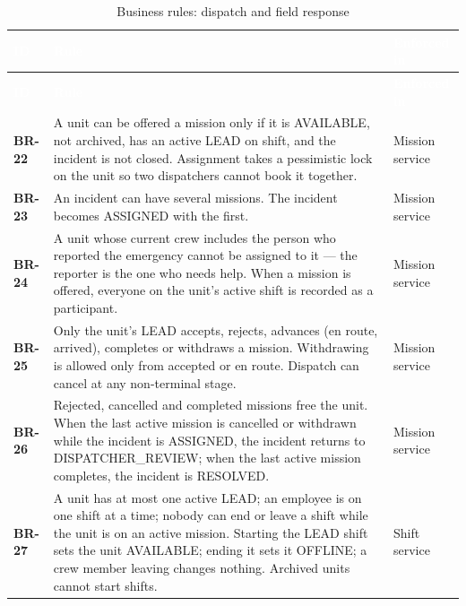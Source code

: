 {\tabfont\rowband
\begin{longtable}{@{}>{\raggedright\arraybackslash}p{}>{\raggedright\arraybackslash}p{}>{\raggedright\arraybackslash}p{}@{}}
\caption{Business rules: dispatch and field response}\label{tab:br-dispatch}\\
\rowcolor{najdanavy}\textcolor{white}{\sffamily\bfseries\small ID} & \textcolor{white}{\sffamily\bfseries\small Rule} & \textcolor{white}{\sffamily\bfseries\small Enforced in}\\
\endfirsthead
\rowcolor{najdanavy}\textcolor{white}{\sffamily\bfseries\small ID} & \textcolor{white}{\sffamily\bfseries\small Rule} & \textcolor{white}{\sffamily\bfseries\small Enforced in}\\
\endhead
\bottomrule\endlastfoot
\textbf{BR-22} & A unit can be offered a mission only if it is AVAILABLE, not archived, has an active LEAD on shift, and the incident is not closed. Assignment takes a pessimistic lock on the unit so two dispatchers cannot book it together. & Mission service\\
\textbf{BR-23} & An incident can have several missions. The incident becomes ASSIGNED with the first. & Mission service\\
\textbf{BR-24} & A unit whose current crew includes the person who reported the emergency cannot be assigned to it --- the reporter is the one who needs help. When a mission is offered, everyone on the unit’s active shift is recorded as a participant. & Mission service\\
\textbf{BR-25} & Only the unit’s LEAD accepts, rejects, advances (en route, arrived), completes or withdraws a mission. Withdrawing is allowed only from accepted or en route. Dispatch can cancel at any non-terminal stage. & Mission service\\
\textbf{BR-26} & Rejected, cancelled and completed missions free the unit. When the last active mission is cancelled or withdrawn while the incident is ASSIGNED, the incident returns to DISPATCHER\_\allowbreak{}REVIEW; when the last active mission completes, the incident is RESOLVED. & Mission service\\
\textbf{BR-27} & A unit has at most one active LEAD; an employee is on one shift at a time; nobody can end or leave a shift while the unit is on an active mission. Starting the LEAD shift sets the unit AVAILABLE; ending it sets it OFFLINE; a crew member leaving changes nothing. Archived units cannot start shifts. & Shift service\\

\end{longtable}}
